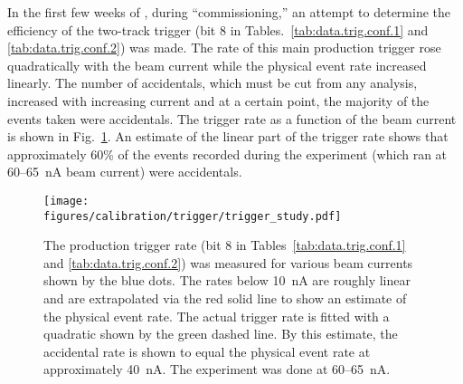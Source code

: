 In the first few weeks of , during ``commissioning,'' an attempt to determine the efficiency of the two-track trigger (bit 8 in Tables.~\ref{tab:data.trig.conf.1} and \ref{tab:data.trig.conf.2}) was made. The rate of this main production trigger rose quadratically with the beam current while the physical event rate increased linearly. The number of accidentals, which must be cut from any analysis, increased with increasing current and at a certain point, the majority of the events taken were accidentals. The trigger rate as a function of the beam current is shown in Fig.~\ref{fig:data.trig.eff}. An estimate of the linear part of the trigger rate shows that approximately 60\% of the events recorded during the  experiment (which ran at 60--65~nA beam current) were accidentals.

\begin{figure}\begin{center}
\texttt{[image: \\figures/calibration/trigger/trigger\_study.pdf]}
\caption[Trigger Rate vs. Beam Current]{\label{fig:data.trig.eff}{}The production trigger rate (bit 8 in Tables~\ref{tab:data.trig.conf.1} and \ref{tab:data.trig.conf.2}) was measured for various beam currents shown by the blue dots. The rates below 10~nA are roughly linear and are extrapolated via the red solid line to show an estimate of the physical event rate. The actual trigger rate is fitted with a quadratic shown by the green dashed line. By this estimate, the accidental rate is shown to equal the physical event rate at approximately 40~nA. The  experiment was done at 60--65~nA.}
\end{center}\end{figure}

\clearpage
